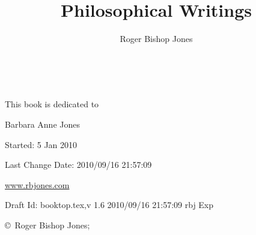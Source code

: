 \documentclass[10pt,titlepage]{book}
\author{Roger Bishop Jones}
\title{Philosophical Writings}
\date{\ }
\begin{document}
\frontmatter

\begin{titlepage}
\maketitle

\vfill

\begin{centering}

{\parskip=0.3in
This book is dedicated to

{ Barbara Anne Jones}
}

\vfill

{\footnotesize

Started: 5 Jan 2010

Last Change $ $Date: 2010/09/16 21:57:09 $ $

\href{http://www.rbjones.com/}{www.rbjones.com}

Draft $ $Id: booktop.tex,v 1.6 2010/09/16 21:57:09 rbj Exp $ $

\copyright\ Roger Bishop Jones;

}%

\end{centering}

\thispagestyle{empty}
\end{titlepage}

{\parskip=0pt\tableofcontents}
\end{document}
